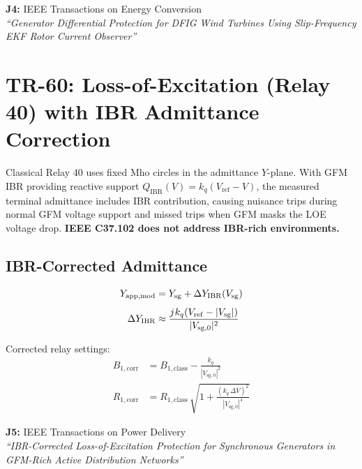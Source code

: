 \documentclass[12pt, a4paper]{report}
\newcommand{\jj}{j\mkern1mu}
\begin{document}
\begin{tcolorbox}[pubbox, title={Publications — TR-59}]
\textbf{J4:} IEEE Transactions on Energy Conversion\\
\textit{``Generator Differential Protection for DFIG Wind Turbines Using Slip-Frequency EKF Rotor Current Observer''}
\end{tcolorbox}

\section{TR-60: Loss-of-Excitation (Relay 40) with IBR Admittance Correction}

\begin{tcolorbox}[gapbox, title={Research Gap — TR-60}]
Classical Relay 40 uses fixed Mho circles in the admittance $Y$-plane. With GFM IBR providing reactive support $Q_\mathrm{IBR}(V) = k_q(V_\mathrm{ref}-V)$, the measured terminal admittance includes IBR contribution, causing nuisance trips during normal GFM voltage support and missed trips when GFM masks the LOE voltage drop. \textbf{IEEE C37.102 does not address IBR-rich environments.}
\end{tcolorbox}

\subsection{IBR-Corrected Admittance}

\begin{align}
  Y_\mathrm{app,mod} &= Y_\mathrm{sg} + \Delta Y_\mathrm{IBR}(V_\mathrm{sg}) \\[4pt]
  \Delta Y_\mathrm{IBR} &\approx \frac{\jj k_q(V_\mathrm{ref} - |V_\mathrm{sg}|)}{|V_\mathrm{sg,0}|^2}
\end{align}

Corrected relay settings:
\begin{align}
  B_{1,\mathrm{corr}} &= B_{1,\mathrm{class}} - \frac{k_q}{|V_\mathrm{sg,0}|^2} \\[4pt]
  R_{1,\mathrm{corr}} &= R_{1,\mathrm{class}}\,\sqrt{1 + \frac{(k_q\,\Delta V)^2}{|V_\mathrm{sg,0}|^4}}
\end{align}

\begin{tcolorbox}[pubbox, title={Publications — TR-60}]
\textbf{J5:} IEEE Transactions on Power Delivery\\
\textit{``IBR-Corrected Loss-of-Excitation Protection for Synchronous Generators in GFM-Rich Active Distribution Networks''}
\end{tcolorbox}
\end{document}
